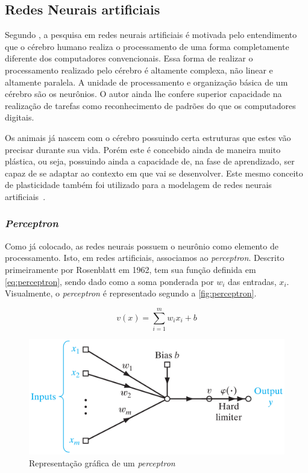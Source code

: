 \documentclass[
    12pt,
    oneside,
    a4paper,
    english,
    brazil
]{abntex2}
\begin{document}
\subsection{Redes Neurais artificiais}

Segundo  , a pesquisa  em  redes  neurais artificiais  é
motivada pelo entendimento que o cérebro  humano realiza o processamento de uma
forma  completamente diferente  dos computadores  convencionais. Essa  forma de
realizar  o processamento  realizado  pelo cérebro  é  altamente complexa,  não
linear e altamente paralela. A unidade de processamento e organização básica de
um cérebro são  os neurônios. O autor ainda lhe  confere superior capacidade na
realização de  tarefas como  reconhecimento de padrões  do que  os computadores
digitais.

Os animais  já nascem com  o cérebro possuindo  certa estruturas que  estes vão
precisar  durante sua  vida.  Porém este  é concebido  ainda  de maneira  muito
plástica, ou seja, possuindo ainda a capacidade de, na fase de aprendizado, ser
capaz de se adaptar ao contexto em  que vai se desenvolver. Este mesmo conceito
de  plasticidade  também  foi  utilizado  para a  modelagem  de  redes  neurais
artificiais~\cite{haykin2009}.

\subsubsection{\textit{Perceptron}}

Como  já  colocado, as  redes  neurais  possuem  o  neurônio como  elemento  de
processamento. Isto,  em redes artificiais, associamos  ao \textit{perceptron}.
Descrito  primeiramente por  Rosenblatt em  1962,  tem sua  função definida  em
\autoref{eq:perceptron},  sendo  dado  como  a soma  ponderada  por  $w_i$  das
entradas, $x_i$.  Visualmente, o  \textit{perceptron} é representado  segundo a
\autoref{fig:perceptron}.

\begin{equation}\label{eq:perceptron}
    v(x) = \sum_{i=1}^{m}{w_i  x_i + b}
\end{equation}

\begin{figure}[ht]
    \centering
    \caption{Representação gráfica de um \textit{perceptron}}\label{fig:perceptron}
    \includegraphics[width=.5\linewidth]{images/perceptron.png}
\end{figure}
\end{document}

